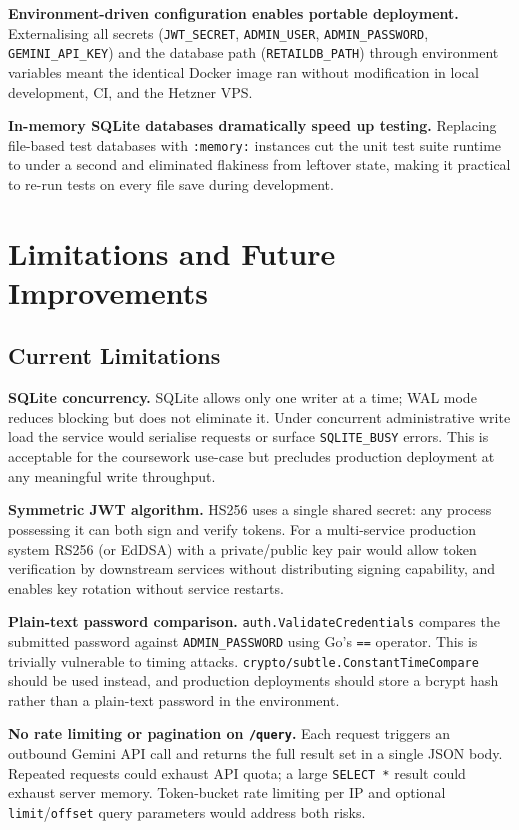 \documentclass[8pt,a4paper]{article}
\begin{document}
\textbf{Environment-driven configuration enables portable deployment.} Externalising all secrets (\texttt{JWT\_SECRET}, \texttt{ADMIN\_USER}, \texttt{ADMIN\_PASSWORD}, \texttt{GEMINI\_API\_KEY}) and the database path (\texttt{RETAILDB\_PATH}) through environment variables meant the identical Docker image ran without modification in local development, CI, and the Hetzner VPS.

\textbf{In-memory SQLite databases dramatically speed up testing.} Replacing file-based test databases with \texttt{:memory:} instances cut the unit test suite runtime to under a second and eliminated flakiness from leftover state, making it practical to re-run tests on every file save during development.

\section{Limitations and Future Improvements}

\subsection{Current Limitations}

\textbf{SQLite concurrency.} SQLite allows only one writer at a time; WAL mode reduces blocking but does not eliminate it. Under concurrent administrative write load the service would serialise requests or surface \texttt{SQLITE\_BUSY} errors. This is acceptable for the coursework use-case but precludes production deployment at any meaningful write throughput.

\textbf{Symmetric JWT algorithm.} HS256 uses a single shared secret: any process possessing it can both sign and verify tokens. For a multi-service production system RS256 (or EdDSA) with a private/public key pair would allow token verification by downstream services without distributing signing capability, and enables key rotation without service restarts.

\textbf{Plain-text password comparison.} \texttt{auth.ValidateCredentials} compares the submitted password against \texttt{ADMIN\_PASSWORD} using Go's \texttt{==} operator. This is trivially vulnerable to timing attacks. \texttt{crypto/subtle.ConstantTimeCompare} should be used instead, and production deployments should store a bcrypt hash rather than a plain-text password in the environment.

\textbf{No rate limiting or pagination on \texttt{/query}.} Each request triggers an outbound Gemini API call and returns the full result set in a single JSON body. Repeated requests could exhaust API quota; a large \texttt{SELECT *} result could exhaust server memory. Token-bucket rate limiting per IP and optional \texttt{limit}/\texttt{offset} query parameters would address both risks.
\end{document}
